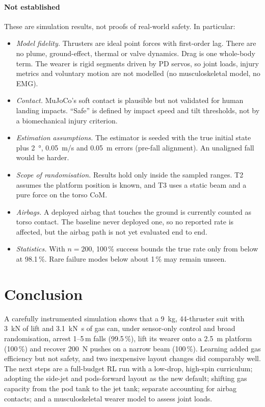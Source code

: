 \documentclass[conference]{IEEEtran}
\begin{document}
\paragraph*{Not established} These are simulation results, not proofs of real-world safety. In particular:
\begin{itemize}
\item \emph{Model fidelity.} Thrusters are ideal point forces with first-order lag. There are no plume, ground-effect, thermal or valve dynamics. Drag is one whole-body term. The wearer is rigid segments driven by PD servos, so joint loads, injury metrics and voluntary motion are not modelled (no musculoskeletal model, no EMG).
\item \emph{Contact.} MuJoCo's soft contact is plausible but not validated for human landing impacts. ``Safe'' is defined by impact speed and tilt thresholds, not by a biomechanical injury criterion.
\item \emph{Estimation assumptions.} The estimator is seeded with the true initial state plus \SI{2}{\degree}, \SI{0.05}{m/s} and \SI{0.05}{m} errors (pre-fall alignment). An unaligned fall would be harder.
\item \emph{Scope of randomisation.} Results hold only inside the sampled ranges. T2 assumes the platform position is known, and T3 uses a static beam and a pure force on the torso CoM.
\item \emph{Airbags.} A deployed airbag that touches the ground is currently counted as torso contact. The baseline never deployed one, so no reported rate is affected, but the airbag path is not yet evaluated end to end.
\item \emph{Statistics.} With $n=200$, 100\,\% success bounds the true rate only from below at 98.1\,\%. Rare failure modes below about 1\,\% may remain unseen.
\end{itemize}

\section{Conclusion}
A carefully instrumented simulation shows that a \SI{9}{kg}, 44-thruster suit with \SI{3}{kN} of lift and \SI{3.1}{kN.s} of gas can, under sensor-only control and broad randomisation, arrest 1--5\,m falls (99.5\,\%), lift its wearer onto a \SI{2.5}{m} platform (100\,\%) and recover \SI{200}{N} pushes on a narrow beam (100\,\%). Learning added gas efficiency but not safety, and two inexpensive layout changes did comparably well. The next steps are a full-budget RL run with a low-drop, high-spin curriculum; adopting the side-jet and pods-forward layout as the new default; shifting gas capacity from the pod tank to the jet tank; separate accounting for airbag contacts; and a musculoskeletal wearer model to assess joint loads.
\end{document}
